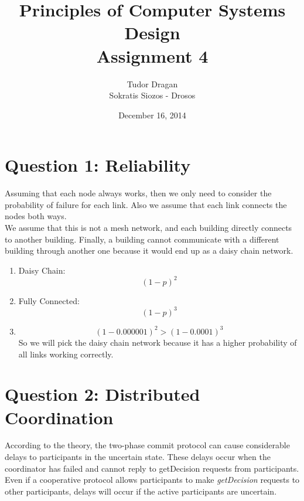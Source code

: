 \documentclass{article}      %
\title{\bf Principles of Computer Systems Design\\ {\Large Assignment 4}}  %
\author{Tudor Dragan\\
Sokratis Siozos - Drosos}      %
\date{December 16, 2014}      %
\begin{document}

\maketitle                   %

\section*{Question 1: Reliability} 

Assuming that each node always works, then we only need to consider the probability of failure for each link. Also we assume that each link connects the nodes both ways.\\

We assume that this is not a mesh network, and each building directly connects to another building. Finally, a building cannot communicate with a different building through another one because it would end up as a daisy chain network.\\

\begin{enumerate}
\item  
Daisy Chain: 
\begin{equation}
(1-p)^2
\end{equation}

\item  
Fully Connected:
\begin{equation}
(1-p)^3
\end{equation}

\item 
\begin{equation}
(1-0.000001)^2 > (1-0.0001)^3
\end{equation}
So we will pick the daisy chain network because it has a higher probability of all links working correctly.
\end{enumerate}

\section*{Question 2: Distributed Coordination}

According to the theory, the two-phase commit protocol can cause considerable delays to participants in the uncertain state. These delays occur when the coordinator has failed and cannot reply to getDecision requests from participants. Even if a cooperative protocol allows participants to make \emph{getDecision} requests to other participants, delays will occur if the active participants are uncertain.  \\
\end{document}
